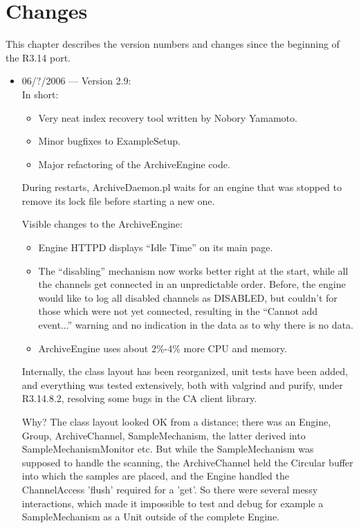 \chapter{Changes}

This chapter describes the version numbers and changes since
the beginning of the R3.14 port.

\begin{itemize}

\item 06/?/2006 --- Version 2.9:\\
In short:
\begin{itemize}
\item Very neat index recovery tool written by Nobory Yamamoto.
\item Minor bugfixes to ExampleSetup.
\item Major refactoring of the ArchiveEngine code.
\end{itemize}

During restarts, ArchiveDaemon.pl waits for an engine that was stopped
to remove its lock file before starting a new one.

Visible changes to the ArchiveEngine:
\begin{itemize}
\item Engine HTTPD displays ``Idle Time'' on its main page.
\item The ``disabling'' mechanism now works better right at the start,
      while all the channels get connected in an unpredictable order.
      Before, the engine would like to log all disabled channels as DISABLED,
      but couldn't for those which were not yet connected,
      resulting in the ``Cannot add event...'' warning and no indication
      in the data as to why there is no data.
\item ArchiveEngine uses about 2\%-4\% more CPU and memory.
\end{itemize}

Internally, the class layout has been reorganized,
unit tests have been added, and everything was tested
extensively, both with valgrind and purify,
under R3.14.8.2, resolving some bugs in the CA client library.

Why? The class layout looked OK from a distance;
there was an Engine, Group, ArchiveChannel, SampleMechanism,
the latter derived into SampleMechanismMonitor etc.
But while the SampleMechanism was supposed to handle
the scanning, the ArchiveChannel held the Circular buffer
into which the samples are placed,
and the Engine handled the ChannelAccess 'flush' required
for a 'get'. So there were several messy interactions,
which made it impossible to test and debug for example a SampleMechanism
as a Unit outside of the complete Engine.


\end{itemize}

